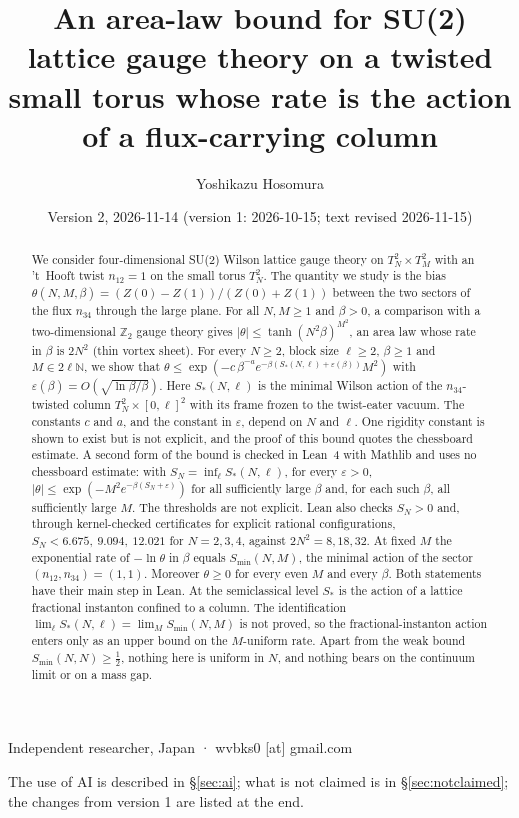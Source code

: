 \documentclass[11pt,a4paper]{article}
\title{An area-law bound for SU(2) lattice gauge theory on a twisted small torus whose rate is the action of a flux-carrying column}
\author{Yoshikazu Hosomura}
\date{Version 2, 2026-11-14 (version 1: 2026-10-15; text revised 2026-11-15)}
\theoremstyle{definition}
\theoremstyle{remark}
\begin{document}
\maketitle
\begin{center}\small Independent researcher, Japan · wvbks0 [at] gmail.com\end{center}
\begin{center}\small The use of AI is described in \S\ref{sec:ai}; what is not claimed is in \S\ref{sec:notclaimed}; the changes from version 1 are listed at the end.\end{center}

\begin{abstract}
We consider four-dimensional SU(2) Wilson lattice gauge theory on $T^2_N\times T^2_M$ with an 't~Hooft twist $n_{12}=1$ on the small torus $T^2_N$.
The quantity we study is the bias $\theta(N,M,\beta)=(Z(0)-Z(1))/(Z(0)+Z(1))$ between the two sectors of the flux $n_{34}$ through the large plane.
For all $N,M\ge1$ and $\beta>0$, a comparison with a two-dimensional $\mathbb{Z}_2$ gauge theory gives $|\theta|\le\tanh(N^2\beta)^{M^2}$, an area law whose rate in $\beta$ is $2N^2$ (thin vortex sheet).
For every $N\ge2$, block size $\ell\ge2$, $\beta\ge1$ and $M\in2\ell\mathbb{N}$, we show that $\theta\le\exp(-c\,\beta^{-a}e^{-\beta(S_*(N,\ell)+\varepsilon(\beta))}M^2)$ with $\varepsilon(\beta)=O(\sqrt{\ln\beta/\beta})$.
Here $S_*(N,\ell)$ is the minimal Wilson action of the $n_{34}$-twisted column $T^2_N\times[0,\ell]^2$ with its frame frozen to the twist-eater vacuum.
The constants $c$ and $a$, and the constant in $\varepsilon$, depend on $N$ and $\ell$.
One rigidity constant is shown to exist but is not explicit, and the proof of this bound quotes the chessboard estimate.
A second form of the bound is checked in Lean~4 with Mathlib and uses no chessboard estimate: with $S_N=\inf_\ell S_*(N,\ell)$, for every $\varepsilon>0$, $|\theta|\le\exp(-M^2e^{-\beta(S_N+\varepsilon)})$ for all sufficiently large $\beta$ and, for each such $\beta$, all sufficiently large $M$.
The thresholds are not explicit.
Lean also checks $S_N>0$ and, through kernel-checked certificates for explicit rational configurations, $S_N<6.675,\ 9.094,\ 12.021$ for $N=2,3,4$, against $2N^2=8,18,32$.
At fixed $M$ the exponential rate of $-\ln\theta$ in $\beta$ equals $S_{\min}(N,M)$, the minimal action of the sector $(n_{12},n_{34})=(1,1)$.
Moreover $\theta\ge0$ for every even $M$ and every $\beta$.
Both statements have their main step in Lean.
At the semiclassical level $S_*$ is the action of a lattice fractional instanton confined to a column.
The identification $\lim_\ell S_*(N,\ell)=\lim_M S_{\min}(N,M)$ is not proved, so the fractional-instanton action enters only as an upper bound on the $M$-uniform rate.
Apart from the weak bound $S_{\min}(N,N)\ge\frac12$, nothing here is uniform in $N$, and nothing bears on the continuum limit or on a mass gap.
\end{abstract}
\end{document}
